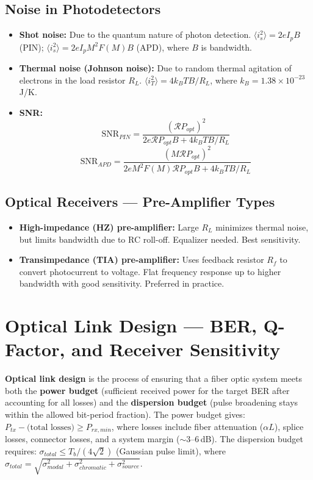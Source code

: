 \documentclass[12pt,a4paper]{article}
\begin{document}
\subsection{Noise in Photodetectors}
\begin{itemize}[leftmargin=*, itemsep=3pt]
  \item \textbf{Shot noise:} Due to the quantum nature of photon detection. $\langle i_s^2 \rangle = 2eI_p B$ (PIN); $\langle i_s^2 \rangle = 2eI_p M^2 F(M) B$ (APD), where $B$ is bandwidth.
  \item \textbf{Thermal noise (Johnson noise):} Due to random thermal agitation of electrons in the load resistor $R_L$. $\langle i_T^2 \rangle = 4k_B T B / R_L$, where $k_B = 1.38\times10^{-23}$\,J/K.
  \item \textbf{SNR:}
\[
\text{SNR}_{PIN} = \frac{(\mathcal{R} P_{opt})^2}{2e\mathcal{R} P_{opt} B + 4k_B T B/R_L}
\]
\[
\text{SNR}_{APD} = \frac{(M\mathcal{R} P_{opt})^2}{2eM^2 F(M)\mathcal{R} P_{opt} B + 4k_B T B/R_L}
\]
\end{itemize}

\subsection{Optical Receivers --- Pre-Amplifier Types}
\begin{itemize}[leftmargin=*, itemsep=3pt]
  \item \textbf{High-impedance (HZ) pre-amplifier:} Large $R_L$ minimizes thermal noise, but limits bandwidth due to RC roll-off. Equalizer needed. Best sensitivity.
  \item \textbf{Transimpedance (TIA) pre-amplifier:} Uses feedback resistor $R_f$ to convert photocurrent to voltage. Flat frequency response up to higher bandwidth with good sensitivity. Preferred in practice.
\end{itemize}

\section{Optical Link Design --- BER, Q-Factor, and Receiver Sensitivity}

\textbf{Optical link design} is the process of ensuring that a fiber optic system meets both the \textbf{power budget} (sufficient received power for the target BER after accounting for all losses) and the \textbf{dispersion budget} (pulse broadening stays within the allowed bit-period fraction). The power budget gives: $P_{tx} - \text{(total losses)} \geq P_{rx,min}$, where losses include fiber attenuation ($\alpha L$), splice losses, connector losses, and a system margin ($\sim$3--6\,dB). The dispersion budget requires: $\sigma_{total} \leq T_b/(4\sqrt{2})$ (Gaussian pulse limit), where $\sigma_{total} = \sqrt{\sigma_{modal}^2 + \sigma_{chromatic}^2 + \sigma_{source}^2}$.
\end{document}
